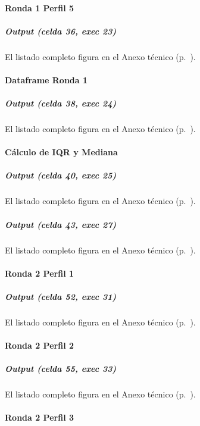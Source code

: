 
\paragraph{Ronda 1 Perfil 5}

\subparagraph{Output (celda 36, exec 23)}
El listado completo figura en el Anexo técnico (p.~\pageref{anexo:code-6-3-2-6}).


\paragraph{Dataframe Ronda 1}

\subparagraph{Output (celda 38, exec 24)}
El listado completo figura en el Anexo técnico (p.~\pageref{anexo:code-6-3-2-7}).


\paragraph{Cálculo de IQR y Mediana}

\subparagraph{Output (celda 40, exec 25)}
El listado completo figura en el Anexo técnico (p.~\pageref{anexo:code-6-3-2-8}).

\subparagraph{Output (celda 43, exec 27)}
El listado completo figura en el Anexo técnico (p.~\pageref{anexo:code-6-3-2-9}).


\paragraph{Ronda 2 Perfil 1}

\subparagraph{Output (celda 52, exec 31)}
El listado completo figura en el Anexo técnico (p.~\pageref{anexo:code-6-3-2-10}).


\paragraph{Ronda 2 Perfil 2}

\subparagraph{Output (celda 55, exec 33)}
El listado completo figura en el Anexo técnico (p.~\pageref{anexo:code-6-3-2-11}).


\paragraph{Ronda 2 Perfil 3}

